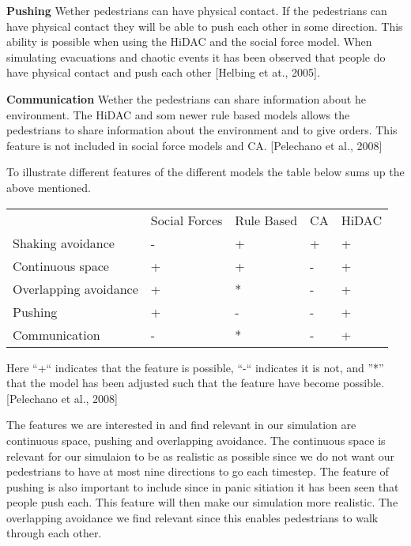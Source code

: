 \textbf{Pushing} Wether pedestrians can have physical contact. If the pedestrians can have physical contact they will be able to push each other in some
direction. This ability is possible when using the HiDAC and the social force model. When simulating evacuations and chaotic events it has been observed
that people do have physical contact and push each other [Helbing et at., 2005].

\textbf{Communication} Wether the pedestrians can share information about he environment. The HiDAC and som newer rule based models allows the pedestrians
to share information about the environment and to give orders. This feature is not included in social force models and CA. [Pelechano et al., 2008]

To illustrate different features of the different models the table below sums up the above mentioned.
\begin{center}
\begin{tabular}{lllll}
 & Social Forces & Rule Based & CA & HiDAC\\
Shaking avoidance     & - & + & + & +\\
Continuous space      & + & + & - & +\\
Overlapping avoidance & + & * & - & +\\
Pushing               & + & - & - & +\\
Communication         & - & * & - & +
\end{tabular}
\end{center}
Here ``+`` indicates that the feature is possible, ``-`` indicates it is not, and ''*'' that the model has been adjusted such that the feature have
become possible. [Pelechano et al., 2008]

The features we are interested in and find relevant in our simulation are continuous space, pushing and overlapping avoidance. The continuous space is
relevant for our simulaion to be as realistic as possible since we do not want our pedestrians to have at most nine directions to go each timestep.
The feature of pushing is also important to include since in panic sitiation it has been seen that people push each. This feature will then make our
simulation more realistic.
The overlapping avoidance we find relevant since this enables pedestrians to walk through each other.

